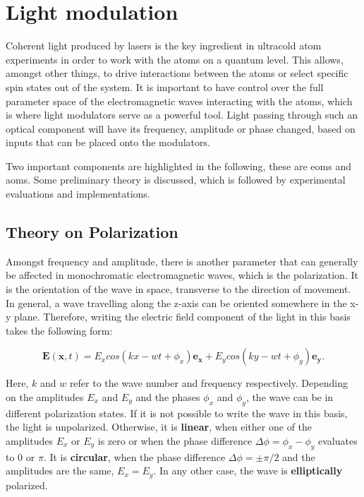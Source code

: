 \chapter{Light modulation}

Coherent light produced by lasers is the key ingredient in ultracold atom experiments in order to work with the atoms on a quantum level. This allows, amongst other things, to drive interactions between the atoms or select specific spin states out of the system. It is important to have control over the full parameter space of the electromagnetic waves interacting with the atoms, which is where light modulators serve as a powerful tool. Light passing through such an optical component will have its frequency, amplitude or phase changed, based on inputs that can be placed onto the modulators.

Two important components are highlighted in the following, these are \acp{eom} and \acp{aom}. Some preliminary theory is discussed, which is followed by experimental evaluations and implementations.

\section{Theory on Polarization}

\label{sec:pol}

Amongst frequency and amplitude, there is another parameter that can generally be affected in monochromatic electromagnetic waves, which is the polarization. It is the orientation of the wave in space, transverse to the direction of movement.  In general, a wave travelling along the z-axis can be oriented somewhere in the x-y plane. Therefore, writing the electric field component of the light in this basis takes the following form:

\begin{equation}
	\mathbf{E}(\mathbf{x}, t) = E_x cos\left(kx - wt + \phi_x\right) \mathbf{e_x} + E_y cos\left(ky - wt + \phi_y\right) \mathbf{e_y} .
\end{equation}

Here, $k$ and $w$ refer to the wave number and frequency respectively.
Depending on the amplitudes $E_x$ and $E_y$ and the phases $\phi_x$ and $\phi_y$, the wave can be in different polarization states. If it is not possible to write the wave in this basis, the light is unpolarized. Otherwise, it is \textbf{linear}, when either one of the amplitudes $E_x$ or $E_y$ is zero or when the phase difference $\Delta \phi = \phi_x - \phi_y$ evaluates to 0 or $\pi$. It is \textbf{circular}, when the phase difference $\Delta \phi = \pm \pi/2$ and the amplitudes are the same, $E_x = E_y$. In any other case, the wave is \textbf{elliptically} polarized.

